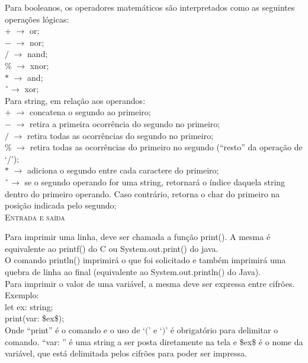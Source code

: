 \documentclass[12pt,a4paper]{article}
\begin{document}
Para booleanos, os operadores matemáticos são interpretados como as seguintes operações lógicas:\\[0.2cm]
$+$ $\rightarrow$ or;\\
$-$ $\rightarrow$ nor;\\
$/$ $\rightarrow$ nand;\\
\% $\rightarrow$ xnor;\\
$*$ $\rightarrow$ and;\\
\^ \ $\rightarrow$ xor;\\

Para string, em relação aos operandos:\\[0.15cm]
$+$ $\rightarrow$ concatena o segundo ao primeiro;\\
$-$ $\rightarrow$ retira a primeira ocorrência do segundo no primeiro;\\
$/$ $\rightarrow$ retira todas as ocorrências do segundo no primeiro;\\
\% $\rightarrow$ retira todas as ocorrências do primeiro no segundo (``resto'' da operação de `/');\\
$*$ $\rightarrow$ adiciona o segundo entre cada caractere do primeiro;\\
\^ \ $\rightarrow$ se o segundo operando for uma string, retornará o índice daquela string dentro do primeiro operando. Caso contrário, retorna o char do primeiro na posição indicada pelo segundo;\\

\hypertarget{label1}{\Large{\textsc{Entrada e saída}}}\\[0.3cm]
\normalsize

Para imprimir uma linha, deve ser chamada a função print(). A mesma é equivalente ao printf() do C ou System.out.print() do java.\\
O comando println() imprimirá o que foi solicitado e também imprimirá uma quebra de linha ao final (equivalente ao System.out.println() do Java).\\

Para imprimir o valor de uma variável, a mesma deve ser expressa entre cifrões. Exemplo: \\

let ex: string;\\

print(var: \$ex\$); \\

Onde ``print'' é o comando e o uso de `$($' e `$)$' é obrigatório para delimitar o comando. ``var: '' é uma string a ser posta diretamente na tela e \$ex\$ é o nome da variável, que está delimitada pelos cifrões para poder ser impressa.\\
\end{document}
